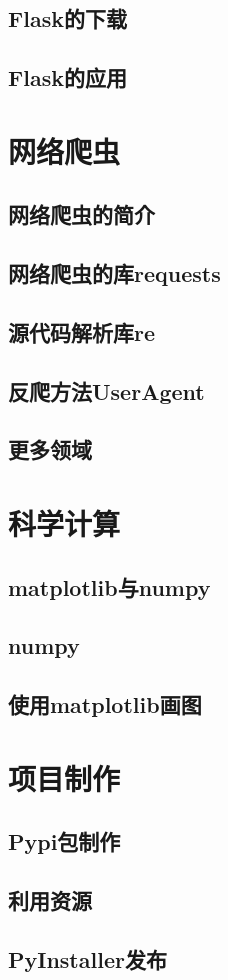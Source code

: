 \documentclass{book}
\begin{document}
\section{Flask的下载}
\section{Flask的应用}
\chapter{网络爬虫}
\section{网络爬虫的简介}
\section{网络爬虫的库requests}
\section{源代码解析库re}
\section{反爬方法UserAgent}
\section{更多领域}
\chapter{科学计算}
\section{matplotlib与numpy}
\section{numpy}
\section{使用matplotlib画图}
\chapter{项目制作}
\section{Pypi包制作}
\section{利用资源}
\section{PyInstaller发布}
\end{document}
